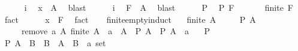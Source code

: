 \begin{isabellebody}
\ \ \ \ \isamarkupfalse%
\ i\ \isamarkupfalse%
\ {\isachardoublequoteopen}x\ {\isasymin}\ A{\isachardoublequoteclose}\ \isamarkupfalse%
\ blast\isanewline
\ \ \ \ \isamarkupfalse%
\ i\ \isamarkupfalse%
\ {\isachardoublequoteopen}F\ {\isasymsubseteq}\ A{\isachardoublequoteclose}\ \isamarkupfalse%
\ blast\isanewline
\ \ \ \ \isamarkupfalse%
\ P\ \isamarkupfalse%
\ {\isachardoublequoteopen}P\ F{\isachardoublequoteclose}\ \isacommand{{\isachardot}{\kern0pt}}\isamarkupfalse%
\isanewline
\ \ \ \ \isamarkupfalse%
\ {\isachardoublequoteopen}finite\ F{\isachardoublequoteclose}\ \isamarkupfalse%
\ fact\isanewline
\ \ \ \ \isamarkupfalse%
\ {\isachardoublequoteopen}x\ {\isasymnotin}\ F{\isachardoublequoteclose}\ \isamarkupfalse%
\ fact\isanewline
\ \ \isamarkupfalse%
\isanewline
{}\isamarkupfalse%
%
\endisatagproof
{\isafoldproof}%
%
\isadelimproof
\isanewline
%
\endisadelimproof
\isanewline
{}\isamarkupfalse%
\ finite{\isacharunderscore}{\kern0pt}empty{\isacharunderscore}{\kern0pt}induct{\isacharcolon}{\kern0pt}\isanewline
\ \ \ {\isachardoublequoteopen}finite\ A{\isachardoublequoteclose}\isanewline
\ \ \ \ \ {\isachardoublequoteopen}P\ A{\isachardoublequoteclose}\isanewline
\ \ \ \ \ remove{\isacharcolon}{\kern0pt}\ {\isachardoublequoteopen}{\isasymAnd}a\ A{\isachardot}{\kern0pt}\ finite\ A\ {\isasymLongrightarrow}\ a\ {\isasymin}\ A\ {\isasymLongrightarrow}\ P\ A\ {\isasymLongrightarrow}\ P\ {\isacharparenleft}{\kern0pt}A\ {\isacharminus}{\kern0pt}\ {\isacharbraceleft}{\kern0pt}a{\isacharbraceright}{\kern0pt}{\isacharparenright}{\kern0pt}{\isachardoublequoteclose}\isanewline
\ \ \ {\isachardoublequoteopen}P\ {\isacharbraceleft}{\kern0pt}{\isacharbraceright}{\kern0pt}{\isachardoublequoteclose}\isanewline
%
\isadelimproof
%
\endisadelimproof
%
\isatagproof
{}\isamarkupfalse%
\ {\isacharminus}{\kern0pt}\isanewline
\ \ \isamarkupfalse%
\ {\isachardoublequoteopen}P\ {\isacharparenleft}{\kern0pt}A\ {\isacharminus}{\kern0pt}\ B{\isacharparenright}{\kern0pt}{\isachardoublequoteclose}\ \ {\isachardoublequoteopen}B\ {\isasymsubseteq}\ A{\isachardoublequoteclose}\ \ B\ {\isacharcolon}{\kern0pt}{\isacharcolon}{\kern0pt}\ {\isachardoublequoteopen}{\isacharprime}{\kern0pt}a\ set{\isachardoublequoteclose}\isanewline

\end{isabellebody}
